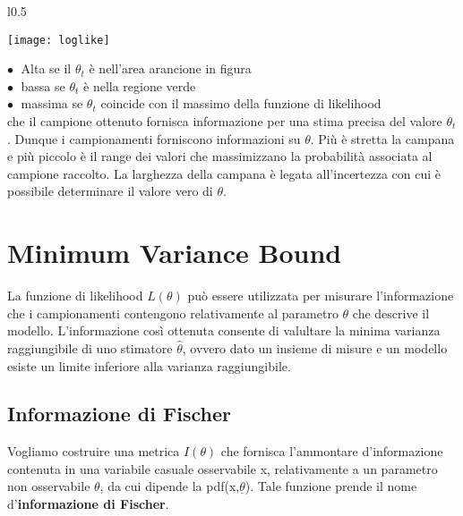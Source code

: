 \begin{wrapfigure}{l}{0.5 \textwidth}

\vspace{-10pt}
\centering
\texttt{[image: loglike]}	

\end{wrapfigure}

\noindent $\bullet \;$  Alta se il $\theta_{t}$  \`{e} nell'area arancione in figura \\
\noindent $\bullet \;$ bassa se $\theta_{t}$ \`{e} nella regione verde \\
\noindent $\bullet \;$ massima se $\theta_{t}$ coincide con il massimo della funzione di likelihood \\
 
\noindent che il campione ottenuto fornisca informazione per una stima precisa del valore $\theta_t$. Dunque i campionamenti forniscono informazioni su $\theta$. Pi\`{u} \`{e} stretta la campana e pi\`{u} piccolo \`{e} il range dei valori che massimizzano la probabilit\`{a} associata al campione raccolto. La larghezza della campana \`{e} legata all'incertezza con cui \`{e} possibile determinare il valore vero di $\theta$.
\newline



\section{Minimum Variance Bound}

La funzione di likelihood $L(\theta)$ pu\`{o} essere utilizzata per misurare l'informazione che i campionamenti contengono relativamente al parametro $\theta$ che descrive il modello. L'informazione cos\`{i} ottenuta consente di valultare la minima varianza  raggiungibile di uno stimatore  $\hat{\theta}$, ovvero dato un insieme di misure e un modello  esiste un limite inferiore  alla varianza raggiungibile.

\subsection{Informazione di Fischer}

Vogliamo costruire una metrica $I ( \theta)$ che fornisca l'ammontare d'informazione contenuta in una variabile casuale osservabile x, relativamente a un parametro non osservabile $\theta$, da cui dipende la pdf(x,$ \underline{\theta}$). Tale funzione  prende il nome d'\textbf{informazione di Fischer}.

